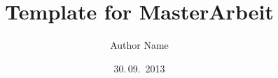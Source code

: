\documentclass[ngerman]{AMmasterArbeit}
\author{Author Name}
\title{Template for MasterArbeit}
\date{30.\,09.~2013}
\begin{document}
\frontmatter
\maketitle

\PrintTablesAndListsOfContents
\mainmatter




\backmatter


\AMPrintBibliography
\end{document}
